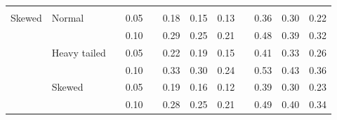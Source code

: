 \documentclass[12pt]{article} %
\begin{document}
\begin{table}[ht]
\begin{scriptsize}
\begin{center}
\begin{tabular}{ll p{.1cm} c p{.1cm} rrr p{.1cm} rrr}
              &&&&&&&&&&&\\
Skewed       & Normal       && 0.05 &&  0.18 & 0.15 & 0.13 && 0.36 & 0.30 & 0.22 \\ 
             &              && 0.10 &&  0.29 & 0.25 & 0.21 && 0.48 & 0.39 & 0.32 \\ 
             & Heavy tailed && 0.05 &&  0.22 & 0.19 & 0.15 && 0.41 & 0.33 & 0.26 \\ 
             &              && 0.10 &&  0.33 & 0.30 & 0.24 && 0.53 & 0.43 & 0.36 \\ 
             & Skewed       && 0.05 &&  0.19 & 0.16 & 0.12 && 0.39 & 0.30 & 0.23 \\ 
             &              && 0.10 &&  0.28 & 0.25 & 0.21 && 0.49 & 0.40 & 0.34 \\

\hline
\end{tabular}
\end{center}
\end{scriptsize}
\end{table}
\end{document}
